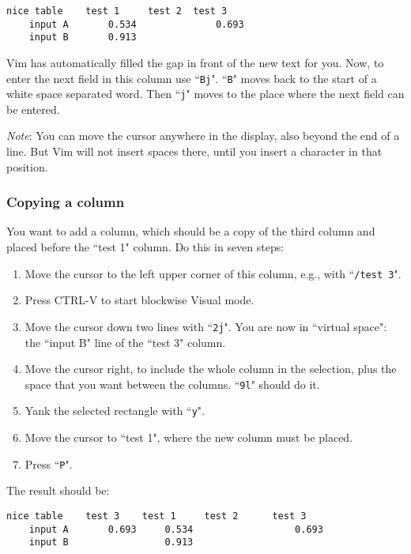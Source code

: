 \begin{Verbatim}[samepage=true]
    nice table    test 1     test 2  test 3 
    input A       0.534              0.693 
    input B       0.913 
\end{Verbatim}

Vim has automatically filled the gap in front of the new text for you.
Now, to enter the next field in this column use ``\texttt{Bj}".
``\texttt{B}" moves back to the start of a white space separated word.
Then ``\texttt{j}" moves to the place where the next field can be entered.

\emph{Note}: You can move the cursor anywhere in the display, also beyond the end of a line.
But Vim will not insert spaces there, until you insert a character in that position.

\subsubsection{Copying a column}
You want to add a column, which should be a copy of the third column and placed before the ``test 1" column.
Do this in seven steps:

\begin{enumerate}
\item Move the cursor to the left upper corner of this column, e.g., with ``\texttt{/test 3}".
\item Press CTRL-V to start blockwise Visual mode.
\item Move the cursor down two lines with ``\texttt{2j}".  You are now in ``virtual space": the ``input B" line of the ``test 3" column.
\item Move the cursor right, to include the whole column in the selection, plus the space that you want between the columns.  ``\texttt{9l}" should do it.
\item Yank the selected rectangle with ``\texttt{y}".
\item Move the cursor to ``test 1", where the new column must be placed.
\item Press ``\texttt{P}".
\end{enumerate}

The result should be:

\begin{Verbatim}[samepage=true]
    nice table    test 3    test 1     test 2      test 3 
    input A       0.693     0.534                  0.693 
    input B                 0.913 
\end{Verbatim}

